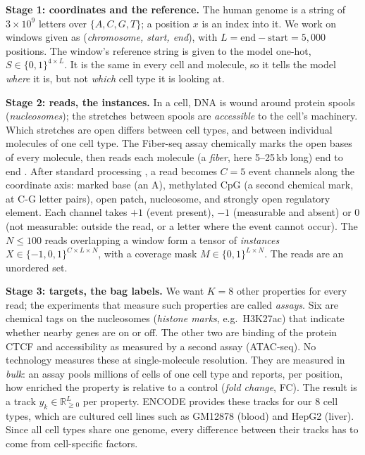 \documentclass[acmtog,nonacm]{acmart}   %
\begin{document}
\textbf{Stage 1: coordinates and the reference.} The human genome is a string of $3\times10^9$
letters over $\{A,C,G,T\}$; a position $x$ is an index into it. We work on windows given as
(\emph{chromosome, start, end}), with $L=\text{end}-\text{start}=5{,}000$ positions. The window's reference string is given to the model one-hot,
$S\in\{0,1\}^{4\times L}$. It is the same in every cell and molecule, so it tells the model
\emph{where} it is, but not \emph{which} cell type it is looking at.

\textbf{Stage 2: reads, the instances.} In a cell, DNA is wound around protein spools
(\emph{nucleosomes}); the stretches between spools are \emph{accessible} to the cell's
machinery. Which stretches are open differs between cell types, and between individual
molecules of one cell type. The Fiber-seq assay chemically marks the open bases of every
molecule, then reads each molecule (a \emph{fiber}, here 5--25\,kb long) end to end
\citep{Stergachis20}. After standard processing \citep{Jha24}, a read becomes $C=5$
event channels along the coordinate axis: marked base (an A), methylated CpG (a second chemical
mark, at C-G letter pairs), open patch, nucleosome, and strongly open regulatory element.
Each channel takes $+1$ (event present), $-1$ (measurable and absent) or $0$ (not measurable:
outside the read, or a letter where the event cannot occur). The $N\le100$ reads
overlapping a window form a tensor of \emph{instances} $X\in\{-1,0,1\}^{C\times L\times N}$,
with a coverage mask $M\in\{0,1\}^{L\times N}$. The reads are an unordered set.

\textbf{Stage 3: targets, the bag labels.} We want $K=8$ other properties for every read;
the experiments that measure such properties are called \emph{assays}. Six are chemical tags on the nucleosomes (\emph{histone marks},
e.g.\ H3K27ac) that indicate whether nearby genes are on or off. The other two are binding
of the protein CTCF and accessibility as measured by a second assay (ATAC-seq). No technology
measures these at single-molecule resolution. They are measured in \emph{bulk}: an assay
pools millions of cells of one cell type and reports, per position, how enriched the property
is relative to a control (\emph{fold change}, FC). The result is a track $y_k\in\mathbb{R}_{\ge0}^{L}$
per property. ENCODE \citep{ENCODE20} provides these tracks for our 8 cell types, which are
cultured cell lines such as GM12878 (blood) and HepG2 (liver). Since all cell types share one
genome, every difference between their tracks has to come from cell-specific factors.
\end{document}
